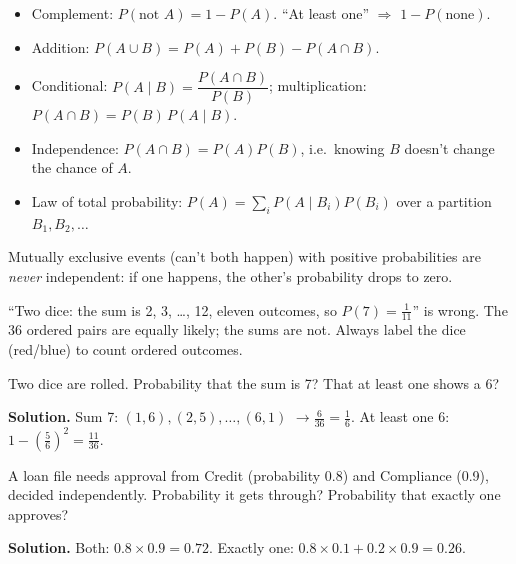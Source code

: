\documentclass[11pt,a4paper,openany]{report}
\begin{document}
\begin{idea}
\begin{itemize}[nosep]
\item Complement: $P(\text{not }A)=1-P(A)$. ``At least one'' $\Rightarrow$ $1-P(\text{none})$.
\item Addition: $P(A\cup B)=P(A)+P(B)-P(A\cap B)$.
\item Conditional: $P(A\mid B)=\dfrac{P(A\cap B)}{P(B)}$; multiplication: $P(A\cap B)=P(B)\,P(A\mid B)$.
\item Independence: $P(A\cap B)=P(A)P(B)$, i.e.\ knowing $B$ doesn't change the chance of $A$.
\item Law of total probability: $P(A)=\sum_iP(A\mid B_i)P(B_i)$ over a partition $B_1,B_2,\dots$
\end{itemize}
\end{idea}

\begin{trap}
Mutually exclusive events (can't both happen) with positive probabilities are \emph{never} independent: if one happens, the other's probability drops to zero.
\end{trap}

\begin{trap}
``Two dice: the sum is 2, 3, \dots, 12, eleven outcomes, so $P(7)=\frac1{11}$'' is wrong. The 36 ordered pairs are equally likely; the sums are not. Always label the dice (red/blue) to count ordered outcomes.
\end{trap}

\begin{example}
Two dice are rolled. Probability that the sum is 7? That at least one shows a 6?

\textbf{Solution.} Sum 7: $(1,6),(2,5),\dots,(6,1)$ $\to\frac6{36}=\frac16$. At least one 6: $1-\left(\frac56\right)^2=\frac{11}{36}$.
\end{example}

\begin{example}
A loan file needs approval from Credit (probability 0.8) and Compliance (0.9), decided independently. Probability it gets through? Probability that exactly one approves?

\textbf{Solution.} Both: $0.8\times0.9=0.72$. Exactly one: $0.8\times0.1+0.2\times0.9=0.26$.
\end{example}
\end{document}
